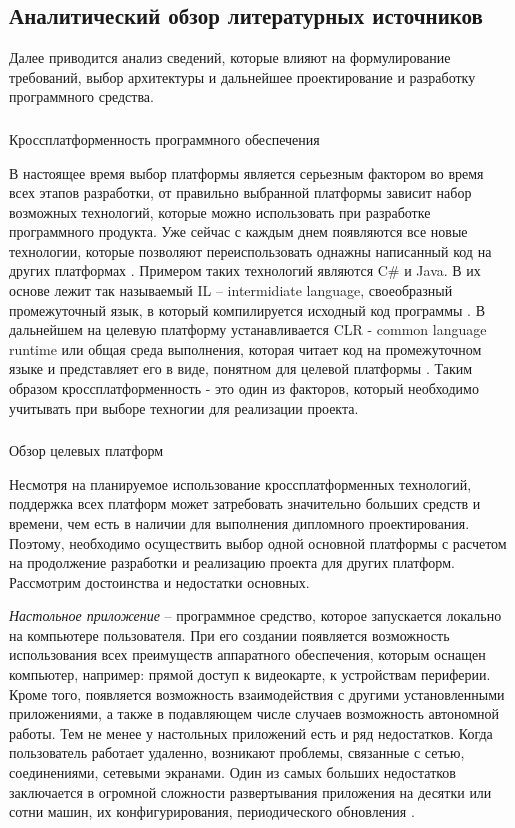 \subsection{Аналитический обзор литературных источников}
\label{sec:analysis:literature}

Далее приводится анализ сведений, которые влияют на формулирование
требований, выбор архитектуры и дальнейшее проектирование и разработку
программного средства.

\subsubsection{} Кроссплатформенность программного обеспечения
\label{sec:analysis:literature:crossplatform}

В настоящее время выбор платформы является серьезным фактором во время всех этапов разработки, от правильно выбранной платформы зависит набор
возможных технологий, которые можно использовать при разработке программного продукта. Уже сейчас с каждым днем появляются все новые технологии,
которые позволяют переиспользовать однажны написанный код на других платформах \cite{habr_crossplatform}. Примером таких технологий являются C\# и Java. В их основе лежит
так называемый IL -- intermidiate language, своеобразный промежуточный язык, в который компилируется исходный код программы \cite{clr_csharp}. В дальнейшем на целевую платформу
устанавливается CLR - common language runtime или общая среда выполнения, которая читает код на промежуточном языке и представляет его в виде, понятном для 
целевой платформы \cite{clr_csharp}. Таким образом кроссплатформенность - это один из факторов, который необходимо учитывать при выборе техногии для реализации проекта.

\subsubsection{} Обзор целевых платформ
\label{sec:analysis:literature:target_platforms}

Несмотря на планируемое использование кроссплатформенных технологий, поддержка всех платформ может затребовать значительно больших средств и времени, чем есть в наличии 
для выполнения дипломного проектирования. Поэтому, необходимо осуществить выбор одной основной платформы с
расчетом на продолжение разработки и реализацию проекта для других платформ. Рассмотрим достоинства и недостатки основных.

\emph{Настольное приложение} – программное средство, которое запускается локально на компьютере пользователя. 
При его создании появляется возможность использования всех преимуществ аппаратного обеспечения, которым оснащен компьютер, например: прямой доступ к видеокарте, к устройствам
периферии. Кроме того, появляется возможность взаимодействия с другими установленными приложениями, а также в подавляющем числе случаев возможность автономной работы.
Тем не менее у настольных приложений есть и ряд недостатков. Когда
пользователь работает удаленно, возникают проблемы, связанные с сетью, соединениями, сетевыми экранами. Один из самых больших недостатков заключается в огромной сложности 
развертывания приложения на десятки или сотни
машин, их конфигурирования, периодического обновления \cite{msdn_desktop_vs_web}.

